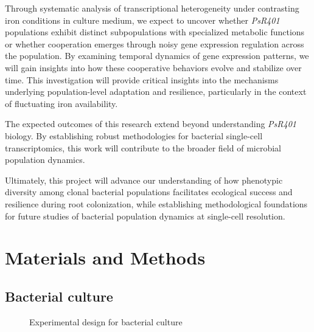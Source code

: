 \documentclass[
  11pt,
  a4paper,
]{report}
\begin{document}
Through systematic analysis of transcriptional heterogeneity under
contrasting iron conditions in culture medium, we expect to uncover
whether \emph{PsR401} populations exhibit distinct subpopulations with
specialized metabolic functions or whether cooperation emerges through
noisy gene expression regulation across the population. By examining
temporal dynamics of gene expression patterns, we will gain insights
into how these cooperative behaviors evolve and stabilize over time.
This investigation will provide critical insights into the mechanisms
underlying population-level adaptation and resilience, particularly in
the context of fluctuating iron availability.

The expected outcomes of this research extend beyond understanding
\emph{PsR401} biology. By establishing robust methodologies for
bacterial single-cell transcriptomics, this work will contribute to the
broader field of microbial population dynamics.

Ultimately, this project will advance our understanding of how
phenotypic diversity among clonal bacterial populations facilitates
ecological success and resilience during root colonization, while
establishing methodological foundations for future studies of bacterial
population dynamics at single-cell resolution.


\chapter{Materials and Methods}\label{sec-materials-and-methods}

\section{Bacterial culture}\label{bacterial-culture}

\begin{figure}


\caption{\label{fig-experimental-design}Experimental design for
bacterial culture}

\end{figure}%
\end{document}
